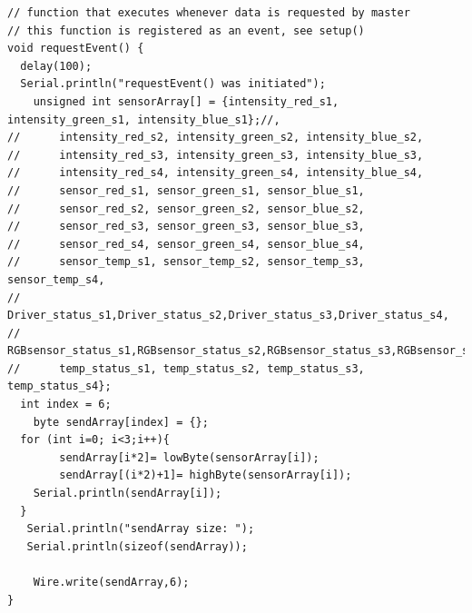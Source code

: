 \documentclass[12pt,a4paper]{report}
\begin{document}
\begin{lstlisting}
// function that executes whenever data is requested by master
// this function is registered as an event, see setup()
void requestEvent() {
  delay(100);
  Serial.println("requestEvent() was initiated");
	unsigned int sensorArray[] = {intensity_red_s1, intensity_green_s1, intensity_blue_s1};//,
//		intensity_red_s2, intensity_green_s2, intensity_blue_s2,
//		intensity_red_s3, intensity_green_s3, intensity_blue_s3,
//		intensity_red_s4, intensity_green_s4, intensity_blue_s4,
//		sensor_red_s1, sensor_green_s1, sensor_blue_s1,
//		sensor_red_s2, sensor_green_s2, sensor_blue_s2,
//		sensor_red_s3, sensor_green_s3, sensor_blue_s3,
//		sensor_red_s4, sensor_green_s4, sensor_blue_s4,
//		sensor_temp_s1, sensor_temp_s2, sensor_temp_s3, sensor_temp_s4,
//		Driver_status_s1,Driver_status_s2,Driver_status_s3,Driver_status_s4,
//		RGBsensor_status_s1,RGBsensor_status_s2,RGBsensor_status_s3,RGBsensor_status_s4,
//		temp_status_s1, temp_status_s2, temp_status_s3, temp_status_s4};
  int index = 6;
	byte sendArray[index] = {};
  for (int i=0; i<3;i++){
		sendArray[i*2]= lowByte(sensorArray[i]);
		sendArray[(i*2)+1]= highByte(sensorArray[i]);
    Serial.println(sendArray[i]);
  }
   Serial.println("sendArray size: ");
   Serial.println(sizeof(sendArray));
	
	Wire.write(sendArray,6); 
}
\end{lstlisting}  
\end{document}
